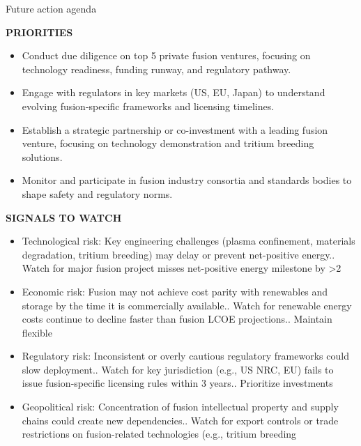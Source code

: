 \documentclass[10pt,a4paper]{article}
\begin{document}
\clearpage
{\sffamily\fontsize{21}{26}\selectfont\color{BONavy} Future action agenda}\par\vspace{7pt}
\begin{minipage}[t]{0.47\linewidth}
{\textcolor{BOGreen}{\scriptsize\bfseries PRIORITIES}}\par\vspace{3pt}
{\small\begin{itemize}
\item Conduct due diligence on top 5 private fusion ventures, focusing on technology readiness, funding runway, and regulatory pathway.
\item Engage with regulators in key markets (US, EU, Japan) to understand evolving fusion-specific frameworks and licensing timelines.
\item Establish a strategic partnership or co-investment with a leading fusion venture, focusing on technology demonstration and tritium breeding solutions.
\item Monitor and participate in fusion industry consortia and standards bodies to shape safety and regulatory norms.
\end{itemize}}
\end{minipage}\hfill\begin{minipage}[t]{0.45\linewidth}
{\textcolor{BOGreen}{\scriptsize\bfseries SIGNALS TO WATCH}}\par\vspace{3pt}
{\small\begin{itemize}
\item Technological risk: Key engineering challenges (plasma confinement, materials degradation, tritium breeding) may delay or prevent net-positive energy.. Watch for major fusion project misses net-positive energy milestone by >2
\item Economic risk: Fusion may not achieve cost parity with renewables and storage by the time it is commercially available.. Watch for renewable energy costs continue to decline faster than fusion LCOE projections.. Maintain flexible
\item Regulatory risk: Inconsistent or overly cautious regulatory frameworks could slow deployment.. Watch for key jurisdiction (e.g., US NRC, EU) fails to issue fusion-specific licensing rules within 3 years.. Prioritize investments
\item Geopolitical risk: Concentration of fusion intellectual property and supply chains could create new dependencies.. Watch for export controls or trade restrictions on fusion-related technologies (e.g., tritium breeding
\end{itemize}}
\end{minipage}
\end{document}
